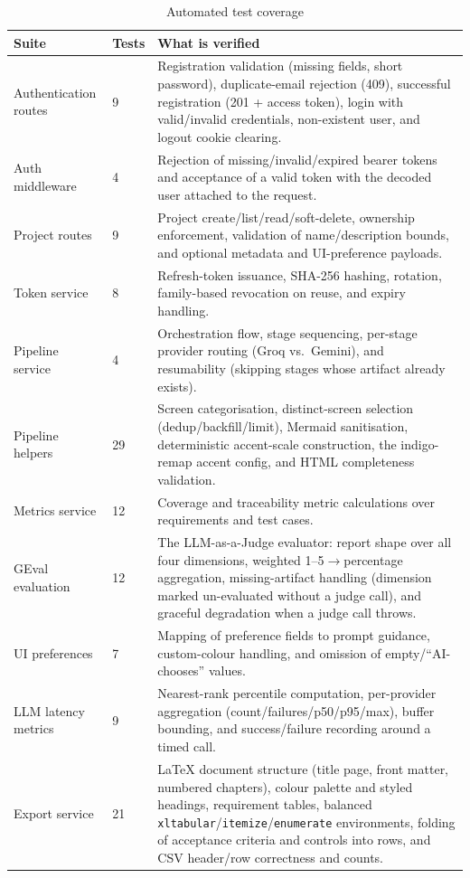 \documentclass[12pt,a4paper,oneside]{report}
\begin{document}
\begin{longtable}{L{3.4cm} L{1.4cm} L{8cm}}
\caption{Automated test coverage}\label{tab:testcoverage}\\
\toprule
\textbf{Suite} & \textbf{Tests} & \textbf{What is verified} \\
\midrule
\endhead
Authentication routes & 9 & Registration validation (missing fields, short password), duplicate-email rejection (409), successful registration (201 + access token), login with valid/invalid credentials, non-existent user, and logout cookie clearing. \\
Auth middleware & 4 & Rejection of missing/invalid/expired bearer tokens and acceptance of a valid token with the decoded user attached to the request. \\
Project routes & 9 & Project create/list/read/soft-delete, ownership enforcement, validation of name/description bounds, and optional metadata and UI-preference payloads. \\
Token service & 8 & Refresh-token issuance, SHA-256 hashing, rotation, family-based revocation on reuse, and expiry handling. \\
Pipeline service & 4 & Orchestration flow, stage sequencing, per-stage provider routing (Groq vs.\ Gemini), and resumability (skipping stages whose artifact already exists). \\
Pipeline helpers & 29 & Screen categorisation, distinct-screen selection (dedup/backfill/limit), Mermaid sanitisation, deterministic accent-scale construction, the indigo-remap accent config, and HTML completeness validation. \\
Metrics service & 12 & Coverage and traceability metric calculations over requirements and test cases. \\
GEval evaluation & 12 & The LLM-as-a-Judge evaluator: report shape over all four dimensions, weighted 1--5\(\rightarrow\)percentage aggregation, missing-artifact handling (dimension marked un-evaluated without a judge call), and graceful degradation when a judge call throws. \\
UI preferences & 7 & Mapping of preference fields to prompt guidance, custom-colour handling, and omission of empty/``AI-chooses'' values. \\
LLM latency metrics & 9 & Nearest-rank percentile computation, per-provider aggregation (count/failures/p50/p95/max), buffer bounding, and success/failure recording around a timed call. \\
Export service & 21 & LaTeX document structure (title page, front matter, numbered chapters), colour palette and styled headings, requirement tables, balanced \texttt{xltabular}/\texttt{itemize}/\texttt{enumerate} environments, folding of acceptance criteria and controls into rows, and CSV header/row correctness and counts. \\
\bottomrule
\end{longtable}
\end{document}
